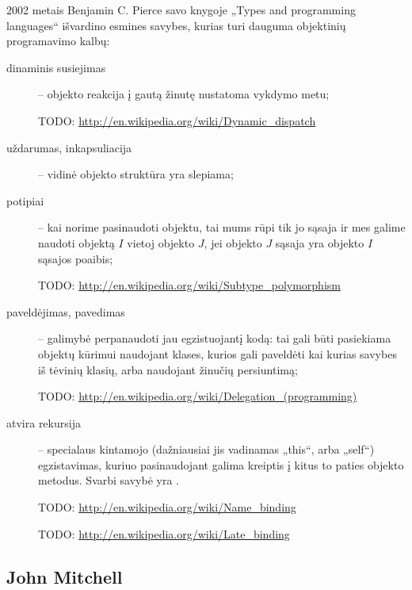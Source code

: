 2002 metais Benjamin C. Pierce savo knygoje „Types and programming
languages“\cite[225-227]{types-and-programming-languages} išvardino
esmines savybes, kurias turi dauguma objektinių programavimo kalbų: 
\begin{description}
  \item[dinaminis susiejimas]  –
    objekto reakcija į gautą žinutę nustatoma vykdymo metu;

    TODO: \url{http://en.wikipedia.org/wiki/Dynamic_dispatch}
  \item[uždarumas, inkapsuliacija]  – vidinė objekto
    struktūra yra slepiama;
  \item[potipiai]  – kai norime pasinaudoti objektu, 
    tai mums rūpi tik jo sąsaja ir mes galime naudoti objektą $I$ vietoj
    objekto $J$, jei objekto $J$ sąsaja yra objekto $I$ sąsajos poaibis;

    TODO: \url{http://en.wikipedia.org/wiki/Subtype_polymorphism}
  \item[paveldėjimas, pavedimas]  – galimybė
    perpanaudoti jau egzistuojantį kodą: tai gali būti pasiekiama
    objektų kūrimui naudojant klases, kurios gali paveldėti kai kurias
    savybes iš tėvinių klasių, arba naudojant žinučių persiuntimą;

    TODO: \url{http://en.wikipedia.org/wiki/Delegation_(programming)}
  \item[atvira rekursija]  – specialaus kintamojo
    (dažniausiai jis vadinamas „this“, arba „self“) egzistavimas, kuriuo
    pasinaudojant galima kreiptis į kitus to paties objekto metodus.
    Svarbi savybė yra .

    TODO: \url{http://en.wikipedia.org/wiki/Name_binding}

    TODO: \url{http://en.wikipedia.org/wiki/Late_binding}
\end{description}

\subsection{John Mitchell}

